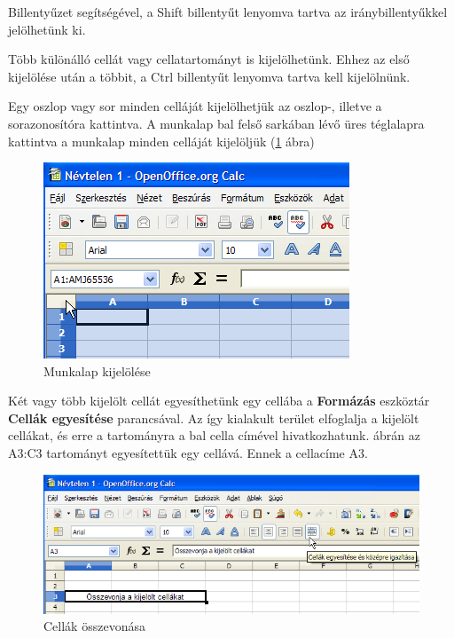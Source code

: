 Billentyűzet segítségével, a Shift billentyűt lenyomva
tartva az iránybillentyűkkel jelölhetünk ki.

Több különálló cellát vagy cellatartományt is
kijelölhetünk. Ehhez az első kijelölése után a többit,
a Ctrl billentyűt lenyomva tartva kell kijelölnünk.

Egy oszlop vagy sor minden celláját kijelölhetjük az oszlop-,
illetve a sorazonosítóra kattintva. A munkalap bal felső
sarkában lévő üres téglalapra kattintva a munkalap minden
celláját kijelöljük (\ref{MunkalapKijelölés} ábra)

\begin{figure}[!h]
\begin{center}
\includegraphics[width=9.126cm]{oocalcv2-img9.png}
\caption{Munkalap kijelölése}\label{MunkalapKijelölés}
\end{center}
\end{figure}

Két vagy több kijelölt cellát egyesíthetünk egy cellába a
\textbf{Formázás} eszköztár \textbf{Cellák egyesítése}
parancsával. Az így kialakult terület elfoglalja a kijelölt
cellákat, és erre a tartományra a bal cella címével
hivatkozhatunk.  ábrán az A3:C3 tartományt
egyesítettük egy cellává. Ennek a cellacíme A3. 

\begin{figure}[!h]
\begin{center}
\includegraphics[width=15.999cm]{oocalcv2-img10.png}
\caption{Cellák összevonása}\label{CellákEgyesítése}
\end{center}
\end{figure}


